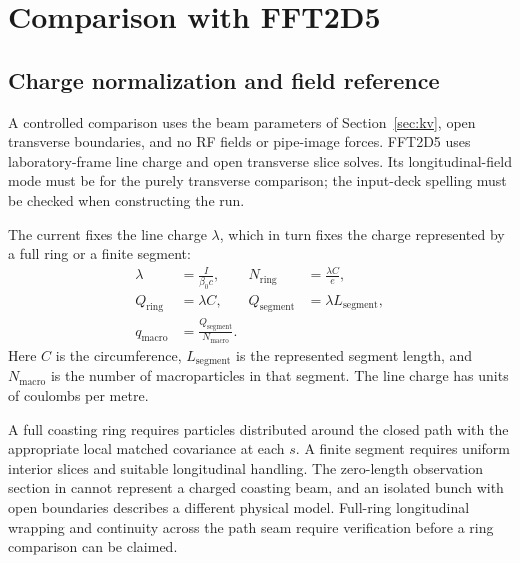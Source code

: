 \documentclass[11pt,a4paper]{article}
\numberwithin{equation}{section}
\begin{document}
\section{Comparison with FFT2D5}
\label{sec:fft2d5}

\subsection{Charge normalization and field reference}

A controlled comparison uses the beam parameters of
Section~\ref{sec:kv}, open transverse boundaries, and no RF fields or
pipe-image forces. FFT2D5 uses laboratory-frame line charge and open
transverse slice solves. Its longitudinal-field mode must be
 for the purely transverse
comparison; the input-deck spelling must be checked when constructing
the run.

The current fixes the line charge $\lambda$, which in turn fixes the
charge represented by a full ring or a finite segment:
\begin{equation}
  \begin{aligned}
    \lambda&=\frac{I}{\beta_0c}, &
    N_{\mathrm{ring}}&=\frac{\lambda C}{e},\\
    Q_{\mathrm{ring}}&=\lambda C, &
    Q_{\mathrm{segment}}&=\lambda L_{\mathrm{segment}},\\
    q_{\mathrm{macro}}&=\frac{Q_{\mathrm{segment}}}{N_{\mathrm{macro}}}.
  \end{aligned}
  \label{eq:charge}
\end{equation}
Here $C$ is the circumference, $L_{\mathrm{segment}}$ is the represented
segment length, and $N_{\mathrm{macro}}$ is the number of macroparticles
in that segment. The line charge has units of coulombs per metre.

A full coasting ring requires particles distributed around the closed
path with the appropriate local matched covariance at each $s$. A finite
segment requires uniform interior slices and suitable longitudinal
handling. The zero-length observation section in 
cannot represent a charged coasting beam, and an isolated bunch with open
boundaries describes a different physical model. Full-ring longitudinal
wrapping and continuity across the path seam require verification before
a ring comparison can be claimed.
\end{document}
